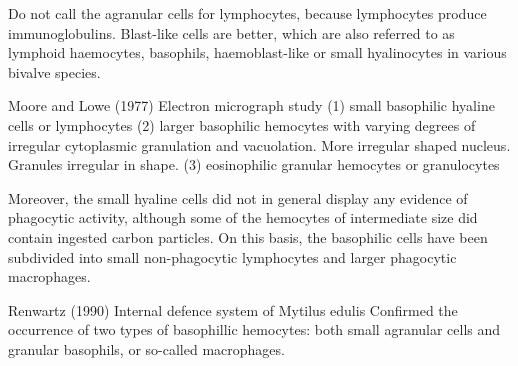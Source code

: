 \begin{table}[ht!]
	\centering
	\caption{Classification of hemocyte subpopulations in \emph{Mytilus edluis}.}
	\label{tb:hemocyte_classification}
\end{table}

Do not call the agranular cells for lymphocytes, because lymphocytes produce immunoglobulins. Blast-like cells are better, which are also referred to as lymphoid haemocytes, basophils, haemoblast-like or small hyalinocytes in various bivalve species.

Moore and Lowe (1977) Electron micrograph study
(1) small basophilic hyaline cells or lymphocytes
(2) larger basophilic hemocytes with varying degrees of irregular cytoplasmic granulation and vacuolation. More irregular shaped nucleus. Granules irregular in shape.
(3) eosinophilic granular hemocytes or granulocytes

Moreover, the small hyaline cells did not in general display any evidence of phagocytic activity, although some of the hemocytes of intermediate size did contain ingested carbon particles. On this basis, the basophilic cells have been subdivided into small non-phagocytic lymphocytes and larger phagocytic macrophages. 

Renwartz (1990) Internal defence system of Mytilus edulis \cite{Renwartz1990}
Confirmed the occurrence of two types of basophillic hemocytes: both small agranular cells and granular basophils, or so-called macrophages.

